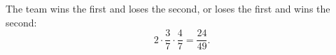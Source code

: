 The team wins the first and loses the second, or loses the first and wins the second:
\[
2\cdot\dfrac{3}{7}\cdot\dfrac{4}{7}=\boxed{\dfrac{24}{49}}.
\]
